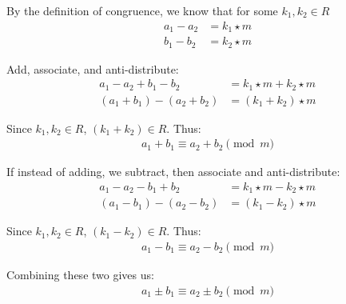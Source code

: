 \documentclass[11pt,fleqn]{article}
\begin{document}
By the definition of congruence, we know that for some $k_1, k_2 \in R$
\begin{align}
    a_1 - a_2 &= k_1 \star m \nonumber\\
    b_1 - b_2 &= k_2 \star m \nonumber
\end{align}

Add, associate, and anti-distribute:
\begin{align}
    a_1 - a_2 + b_1 - b_2 &= k_1 \star m + k_2 \star m \nonumber\\
    (a_1 + b_1) - (a_2 + b_2) &= (k_1 + k_2) \star m \nonumber
\end{align}

Since $k_1, k_2 \in R$, $(k_1 + k_2) \in R$.  Thus:
\begin{align}
a_1 + b_1 \equiv a_2 + b_2 \pmod{m}\nonumber
\end{align}

If instead of adding, we subtract, then associate and anti-distribute:
\begin{align}
    a_1 - a_2 - b_1 + b_2 &= k_1 \star m - k_2 \star m \nonumber\\
    (a_1 - b_1) - (a_2 - b_2) &= (k_1 - k_2) \star m \nonumber
\end{align}

Since $k_1, k_2 \in R$, $(k_1 - k_2) \in R$.  Thus:
\begin{align}
a_1 - b_1 \equiv a_2 - b_2 \pmod{m}\nonumber
\end{align}

Combining these two gives us:
\begin{align}
a_1 \pm b_1 \equiv a_2 \pm b_2 \pmod{m}\nonumber
\end{align}
\end{document}
